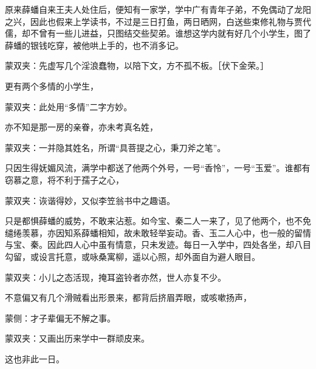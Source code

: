 \begin{parag}
    原来薛蟠自来王夫人处住后，便知有一家学，学中广有青年子弟，不免偶动了龙阳之兴，因此也假来上学读书，不过是三日打鱼，两日晒网，白送些束修礼物与贾代儒，却不曾有一些儿进益，只图结交些契弟。谁想这学内就有好几个小学生，图了薛蟠的银钱吃穿，被他哄上手的，也不消多记。\begin{note}蒙双夹：先虚写几个淫浪蠢物，以陪下文，方不孤不板。［伏下金荣。］\end{note}更有两个多情的小学生，\begin{note}蒙双夹：此处用“多情”二字方妙。\end{note}亦不知是那一房的亲眷，亦未考真名姓，\begin{note}蒙双夹：一并隐其姓名，所谓“具菩提之心，秉刀斧之笔”。\end{note}只因生得妩媚风流，满学中都送了他两个外号，一号“香怜”，一号“玉爱”。谁都有窃慕之意，将不利于孺子之心，\begin{note}蒙双夹：诙谐得妙，又似李笠翁书中之趣语。\end{note}只是都惧薛蟠的威势，不敢来沾惹。如今宝、秦二人一来了，见了他两个，也不免缱绻羡慕，亦因知系薛蟠相知，故未敢轻举妄动。香、玉二人心中，也一般的留情与宝、秦。因此四人心中虽有情意，只未发迹。每日一入学中，四处各坐，却八目勾留，或设言托意，或咏桑寓柳，遥以心照，却外面自为避人眼目。\begin{note}蒙双夹：小儿之态活现，掩耳盗铃者亦然，世人亦复不少。\end{note}不意偏又有几个滑贼看出形景来，都背后挤眉弄眼，或咳嗽扬声，\begin{note}蒙侧：才子辈偏无不解之事。\end{note}\begin{note}蒙双夹：又画出历来学中一群顽皮来。\end{note}这也非此一日。
\end{parag}



